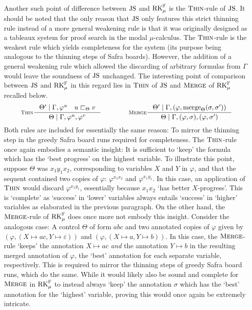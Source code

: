 Another such point of difference between $\mathrm{JS}$ and $\mathrm{RK}_\mu^{\mathbb{F}}$ is the $\textsc{Thin}$-rule
of $\mathrm{JS}$. It should be noted that the only reason that $\mathrm{JS}$ only features this
strict thinning rule instead of a more general weakening rule is that it was
originally designed as a tableaux system for proof search in the modal
$\mu$-calculus. The $\textsc{Thin}$-rule is the weakest rule which yields completeness
for the system (its purpose being analogous to the thinning steps of Safra
boards). However, the addition of a general weakening rule which allowed the
discarding of arbitrary formulas from $\Gamma$ would leave the soundness of
$\mathrm{JS}$ unchanged. The interesting point of comparison between $\mathrm{JS}$ and $\mathrm{RK}_\mu^{\mathbb{F}}$
in this regard lies in $\textsc{Thin}$ of $\mathrm{JS}$ and $\textsc{Merge}$ of $\mathrm{RK}_\mu^{\mathbb{F}}$ recalled
below.
\[
  \inference[\RThin]{\Theta' \rsep \Gamma, \varphi^u \quad u \sqsubset_\Theta v}{\Theta \rsep \Gamma, \varphi^u, \varphi^v}
  \qquad \qquad
  \inference[\(\RMerge\)]{\Theta' \rsep \Gamma, (\varphi,
    \merge_\Theta(\sigma, \sigma'))}{\Theta \rsep \Gamma, (\varphi, \sigma), (\varphi, \sigma')}
\]
Both rules are included for essentially the same reason: To mirror the thinning
step in the greedy Safra board runs required for completeness. The $\textsc{Thin}$-rule
once again embodies a semantic insight: It is sufficient to `keep' the formula
which has the `best progress' on the highest variable. To illustrate this point,
suppose $\Theta$ was $x_1y_1x_2$, corresponding to variables $X$ and $Y$ in
$\varphi$, and that the sequent contained two copies of $\varphi$:
$\varphi^{x_1x_2}$ and $\varphi^{x_1y_1}$. In this case, an application of
$\textsc{Thin}$ would discard $\varphi^{x_1y_1}$, essentially because $x_1x_2$ `has
better $X$-progress'. This is `complete' as `success' in `lower' variables
always entails `success' in `higher' variables as elaborated in the previous
paragraph. On the other hand, the $\textsc{Merge}$-rule of $\mathrm{RK}_\mu^{\mathbb{F}}$ does once more not
embody this insight. Consider the analogous case: A control $\Theta$ of form $abc$ and
two annotated copies of $\varphi$ given by $(\varphi, (X \mapsto ac, Y \mapsto
\varepsilon))$ and $(\varphi, (X \mapsto a, Y \mapsto b))$. In this case, the
$\textsc{Merge}$-rule `keeps' the annotation $X \mapsto ac$ \emph{and} the annotation
$Y \mapsto b$ in the resulting merged annotation of $\varphi$, the `best'
annotation for each separate variable, respectively. This is required to mirror
the thinning steps of greedy Safra board runs, which do the same. While it would
likely also be sound and complete for $\textsc{Merge}$ in $\mathrm{RK}_\mu^{\mathbb{F}}$ to instead always
`keep' the annotation $\sigma$ which has the `best' annotation for the `highest'
variable, proving this would once again be extremely intricate.

